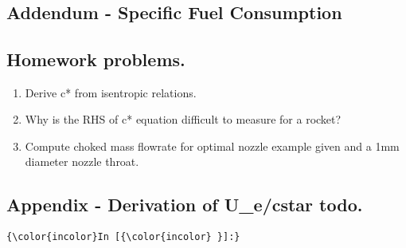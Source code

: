 \documentclass[11pt]{article}
\providecommand{\tightlist}{%
      \setlength{\itemsep}{0pt}\setlength{\parskip}{0pt}}
\begin{document}
    \begin{center}
    \end{center}
    { \hspace*{\fill} \\}
    
    \subsection{Addendum - Specific Fuel
Consumption}\label{addendum---specific-fuel-consumption}

    \subsection{Homework problems.}\label{homework-problems.}

\begin{enumerate}
\def\labelenumi{\arabic{enumi}.}
\tightlist
\item
  Derive c* from isentropic relations.
\item
  Why is the RHS of c* equation difficult to measure for a rocket?
\item
  Compute choked mass flowrate for optimal nozzle example given and a
  1mm diameter nozzle throat.
\end{enumerate}

    \subsection{Appendix - Derivation of U\_e/cstar
todo.}\label{appendix---derivation-of-u_ecstar-todo.}

    \begin{Verbatim}[commandchars=\\\{\}]
{\color{incolor}In [{\color{incolor} }]:} 
\end{Verbatim}


    
    
    
    
\end{document}
